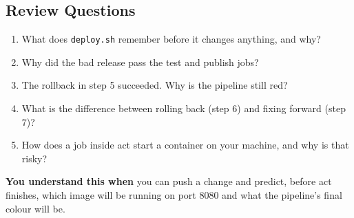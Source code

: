 \subsection*{Review Questions}\label{10-lab-deploy-on-every-push:review-questions}

\begin{enumerate}
\def\labelenumi{\arabic{enumi}.}
\tightlist
\item
  What does \texttt{deploy.sh} remember before it changes anything, and why?
\item
  Why did the bad release pass the test and publish jobs?
\item
  The rollback in step 5 succeeded. Why is the pipeline still red?
\item
  What is the difference between rolling back (step 6) and fixing forward (step 7)?
\item
  How does a job inside act start a container on your machine, and why is that risky?
\end{enumerate}

\begin{understandbox}

\textbf{You understand this when} you can push a change and predict, before act finishes, which image will be running on port 8080 and what the pipeline's final colour will be.

\end{understandbox}
